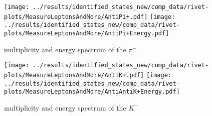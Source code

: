 \begin{figure}[h]
  \centering
  \texttt{[image: ../results/identified\_states\_new/comp\_data/rivet-plots/MeasureLeptonsAndMore/AntiPi+.pdf]}
  \texttt{[image: ../results/identified\_states\_new/comp\_data/rivet-plots/MeasureLeptonsAndMore/AntiPi+Energy.pdf]}
  \caption{multiplicity and energy spectrum of the \(\pi^-\)}
\end{figure}
\begin{figure}[h]
  \centering
  \texttt{[image: ../results/identified\_states\_new/comp\_data/rivet-plots/MeasureLeptonsAndMore/AntiK+.pdf]}
  \texttt{[image: ../results/identified\_states\_new/comp\_data/rivet-plots/MeasureLeptonsAndMore/AntiAntiK+Energy.pdf]}
  \caption{multiplicity and energy spectrum of the \(K^-\)}
\end{figure}



